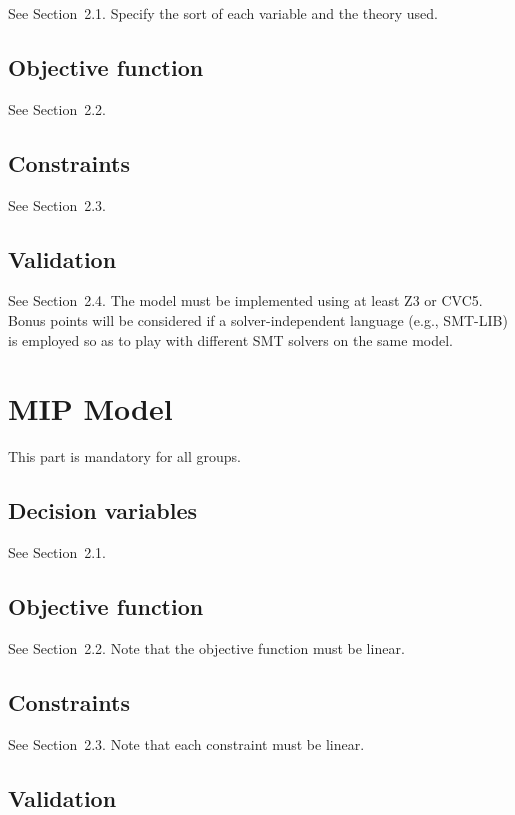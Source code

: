 \documentclass{article}
\begin{document}
See Section~2.1. Specify the sort of each variable and the theory used.

\subsection{Objective function}

See Section~2.2.

\subsection{Constraints}

See Section~2.3.

\subsection{Validation}

See Section~2.4. The model must be implemented using at least Z3 or CVC5. Bonus points will be considered if a solver-independent language (e.g., SMT-LIB) is employed so as to play with different SMT solvers on the same model.

\section{MIP Model}

This part is mandatory for all groups.

\subsection{Decision variables}

See Section~2.1.

\subsection{Objective function}

See Section~2.2. Note that the objective function must be linear.

\subsection{Constraints}

See Section~2.3. Note that each constraint must be linear.

\subsection{Validation}
\end{document}
